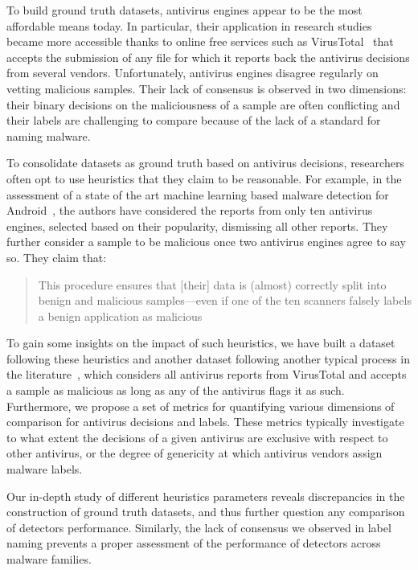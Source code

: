 \localtableofcontents{}

To build ground truth datasets, antivirus engines appear to be the most affordable means today.
In particular, their application in research studies became more accessible thanks to online free services such as VirusTotal~\cite{noauthor_virustotal_nodate} that accepts the submission of any file for which it reports back the antivirus decisions from several vendors.
Unfortunately, antivirus engines disagree regularly on vetting malicious samples.
Their lack of consensus is observed in two dimensions: their binary decisions on the maliciousness of a sample are often conflicting and their labels are challenging to compare because of the lack of a standard for naming malware.

To consolidate datasets as ground truth based on antivirus decisions, researchers often opt to use heuristics that they claim to be reasonable.
For example, in the assessment of a state of the art machine learning based malware detection for Android~\cite{arp_drebin:_2014}, the authors have considered the reports from only ten antivirus engines, selected based on their popularity, dismissing all other reports.
They further consider a sample to be malicious once two antivirus engines agree to say so.
They claim that:

\begin{quote}
	This procedure ensures that [their] data is (almost) correctly split into benign and malicious samples—even if one of the ten scanners falsely labels a benign application as malicious~\cite[p.7]{arp_drebin:_2014}
\end{quote}

To gain some insights on the impact of such heuristics, we have built a dataset following these heuristics and another dataset following another typical process in the literature~\cite{kutylowski_droidminer:_2014}, which considers all antivirus reports from VirusTotal and accepts a sample as malicious as long as any of the antivirus flags it as such.
Furthermore, we propose a set of metrics for quantifying various dimensions of comparison for antivirus decisions and labels.
These metrics typically investigate to what extent the decisions of a given antivirus are exclusive with respect to other antivirus, or the degree of genericity at which antivirus vendors assign malware labels.

Our in-depth study of different heuristics parameters reveals discrepancies in the construction of ground truth datasets, and thus further question any comparison of detectors performance.
Similarly, the lack of consensus we observed in label naming prevents a proper assessment of the performance of detectors across malware families.
